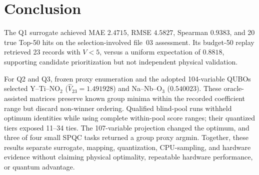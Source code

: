 \section{Conclusion}
\label{sec:conclusion}

The Q1 surrogate achieved MAE $2.4715$, RMSE $4.5827$, Spearman $0.9383$,
and 20 true Top-50 hits on the selection-involved file~03 assessment.  Its
budget-50 replay retrieved 23 records with $V<5$, versus a uniform expectation
of $0.8818$, supporting candidate prioritization but not independent physical
validation.

For Q2 and Q3, frozen proxy enumeration and the adopted 104-variable QUBOs
selected Y--Ti--$\mathrm{NO}_2$ ($\widehat V_{23}=1.491928$) and
Na--Nb--$\mathrm O_3$ ($0.540023$).  These oracle-assisted matrices preserve
known group minima within the recorded coefficient range but discard
non-winner ordering.  Qualified blind-pool runs withheld optimum identities
while using complete within-pool score ranges; their quantized tiers exposed
11--34 ties.  The 107-variable projection changed the optimum, and three of
four small SPQC tasks returned a group proxy argmin.  Together, these results
separate surrogate, mapping, quantization, CPU-sampling, and hardware evidence
without claiming physical optimality, repeatable hardware performance, or
quantum advantage.
